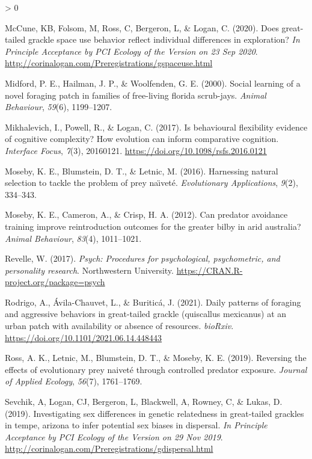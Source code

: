 \documentclass[
]{article}
\newlength{\cslhangindent}
\newenvironment{CSLReferences}[2] %
 {%
  \setlength{\parindent}{0pt}
  \ifodd #1 \everypar{\setlength{\hangindent}{\cslhangindent}}\ignorespaces\fi
  \ifnum #2 > 0
  \setlength{\parskip}{#2\baselineskip}
  \fi
 }%
 {}
\begin{document}
\begin{CSLReferences}{1}{0}
\leavevmode\hypertarget{ref-mccune2020spaceuse}{}%
McCune, KB, Folsom, M, Ross, C, Bergeron, L, \& Logan, C. (2020). Does
great-tailed grackle space use behavior reflect individual differences
in exploration? \emph{In Principle Acceptance by PCI Ecology of the
Version on 23 Sep 2020}.
\url{http://corinalogan.com/Preregistrations/gspaceuse.html}

\leavevmode\hypertarget{ref-midford2000social}{}%
Midford, P. E., Hailman, J. P., \& Woolfenden, G. E. (2000). Social
learning of a novel foraging patch in families of free-living florida
scrub-jays. \emph{Animal Behaviour}, \emph{59}(6), 1199--1207.

\leavevmode\hypertarget{ref-mikhalevich_is_2017}{}%
Mikhalevich, I., Powell, R., \& Logan, C. (2017). Is behavioural
flexibility evidence of cognitive complexity? {How} evolution can inform
comparative cognition. \emph{Interface Focus}, \emph{7}(3), 20160121.
\url{https://doi.org/10.1098/rsfs.2016.0121}

\leavevmode\hypertarget{ref-moseby2016harnessing}{}%
Moseby, K. E., Blumstein, D. T., \& Letnic, M. (2016). Harnessing
natural selection to tackle the problem of prey na{ı̈}vet{é}.
\emph{Evolutionary Applications}, \emph{9}(2), 334--343.

\leavevmode\hypertarget{ref-moseby2012can}{}%
Moseby, K. E., Cameron, A., \& Crisp, H. A. (2012). Can predator
avoidance training improve reintroduction outcomes for the greater bilby
in arid australia? \emph{Animal Behaviour}, \emph{83}(4), 1011--1021.

\leavevmode\hypertarget{ref-psych}{}%
Revelle, W. (2017). \emph{Psych: Procedures for psychological,
psychometric, and personality research}. Northwestern University.
\url{https://CRAN.R-project.org/package=psych}

\leavevmode\hypertarget{ref-Rodrigo2021gtgr}{}%
Rodrigo, A., Ávila-Chauvet, L., \& Buriticá, J. (2021). Daily patterns
of foraging and aggressive behaviors in great-tailed grackle (quiscallus
mexicanus) at an urban patch with availability or absence of resources.
\emph{bioRxiv}. \url{https://doi.org/10.1101/2021.06.14.448443}

\leavevmode\hypertarget{ref-ross2019reversing}{}%
Ross, A. K., Letnic, M., Blumstein, D. T., \& Moseby, K. E. (2019).
Reversing the effects of evolutionary prey naivet{é} through controlled
predator exposure. \emph{Journal of Applied Ecology}, \emph{56}(7),
1761--1769.

\leavevmode\hypertarget{ref-sevchik2019dispersal}{}%
Sevchik, A, Logan, CJ, Bergeron, L, Blackwell, A, Rowney, C, \& Lukas,
D. (2019). Investigating sex differences in genetic relatedness in
great-tailed grackles in tempe, arizona to infer potential sex biases in
dispersal. \emph{In Principle Acceptance by PCI Ecology of the Version
on 29 Nov 2019}.
\url{http://corinalogan.com/Preregistrations/gdispersal.html}


\end{CSLReferences}
\end{document}
